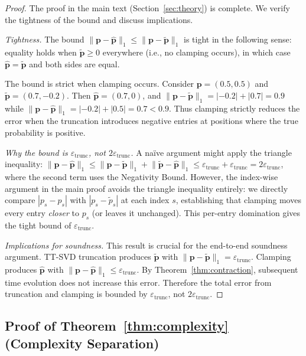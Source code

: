 \documentclass[11pt]{article}
\newcommand{\norm}[1]{\lVert #1 \rVert}
\newcommand{\eps}{\varepsilon}
\begin{document}
\begin{proof}
The proof in the main text (Section~\ref{sec:theory}) is complete.
We verify the tightness of the bound and discuss implications.

\emph{Tightness.}
The bound $\norm{\mathbf{p} - \hat{\mathbf{p}}}_1 \leq
\norm{\mathbf{p} - \tilde{\mathbf{p}}}_1$ is tight in the
following sense: equality holds when $\tilde{\mathbf{p}} \geq 0$
everywhere (i.e., no clamping occurs), in which case
$\hat{\mathbf{p}} = \tilde{\mathbf{p}}$ and both sides are equal.

The bound is strict when clamping occurs.
Consider $\mathbf{p} = (0.5, 0.5)$ and $\tilde{\mathbf{p}} = (0.7, -0.2)$.
Then $\hat{\mathbf{p}} = (0.7, 0)$, and
$\norm{\mathbf{p} - \tilde{\mathbf{p}}}_1 = |{-0.2}| + |0.7| = 0.9$
while $\norm{\mathbf{p} - \hat{\mathbf{p}}}_1 = |{-0.2}| + |0.5| = 0.7 < 0.9$.
Thus clamping strictly reduces the error when the truncation
introduces negative entries at positions where the true probability
is positive.

\emph{Why the bound is $\eps_{\mathrm{trunc}}$, not $2\eps_{\mathrm{trunc}}$.}
A na\"ive argument might apply the triangle inequality:
$\norm{\mathbf{p}-\hat{\mathbf{p}}}_1 \leq
\norm{\mathbf{p}-\tilde{\mathbf{p}}}_1 +
\norm{\tilde{\mathbf{p}}-\hat{\mathbf{p}}}_1
\leq \eps_{\mathrm{trunc}} + \eps_{\mathrm{trunc}} = 2\eps_{\mathrm{trunc}}$,
where the second term uses the Negativity Bound.
However, the index-wise argument in the main proof avoids the
triangle inequality entirely: we directly compare
$|p_s - \hat{p}_s|$ with $|p_s - \tilde{p}_s|$ at each index $s$,
establishing that clamping moves every entry \emph{closer} to $p_s$
(or leaves it unchanged).
This per-entry domination gives the tight bound of $\eps_{\mathrm{trunc}}$.

\emph{Implications for soundness.}
This result is crucial for the end-to-end soundness argument.
TT-SVD truncation produces $\tilde{\mathbf{p}}$ with
$\norm{\mathbf{p} - \tilde{\mathbf{p}}}_1 = \eps_{\mathrm{trunc}}$.
Clamping produces $\hat{\mathbf{p}}$ with
$\norm{\mathbf{p} - \hat{\mathbf{p}}}_1 \leq \eps_{\mathrm{trunc}}$.
By Theorem~\ref{thm:contraction}, subsequent time evolution does
not increase this error.
Therefore the total error from truncation and clamping is bounded
by $\eps_{\mathrm{trunc}}$, not $2\eps_{\mathrm{trunc}}$.
\end{proof}

\subsection{Proof of Theorem~\ref{thm:complexity} (Complexity Separation)}
\end{document}

